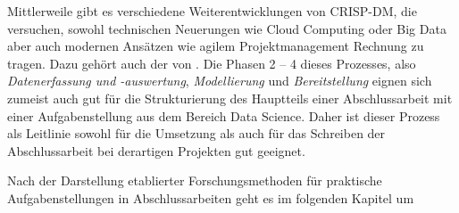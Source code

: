 Mittlerweile gibt es verschiedene Weiterentwicklungen von CRISP-DM, die versuchen, sowohl technischen
Neuerungen wie Cloud Computing oder Big Data aber auch modernen Ansätzen wie agilem
Projektmanagement Rechnung zu tragen. Dazu gehört auch der 
von \textcite{Microsoft2018}. Die Phasen 2 -- 4 dieses Prozesses, also \emph{Datenerfassung und -auswertung},
\emph{Modellierung} und \emph{Bereitstellung} eignen sich zumeist auch gut für die Strukturierung des
Hauptteils einer Abschlussarbeit mit einer Aufgabenstellung aus dem Bereich Data Science. Daher
ist dieser Prozess als Leitlinie sowohl für die Umsetzung als auch für das Schreiben der Abschlussarbeit
bei derartigen Projekten gut geeignet.

Nach der Darstellung etablierter Forschungsmethoden für praktische Aufgabenstellungen in
Abschlussarbeiten geht es im folgenden Kapitel um 
%
